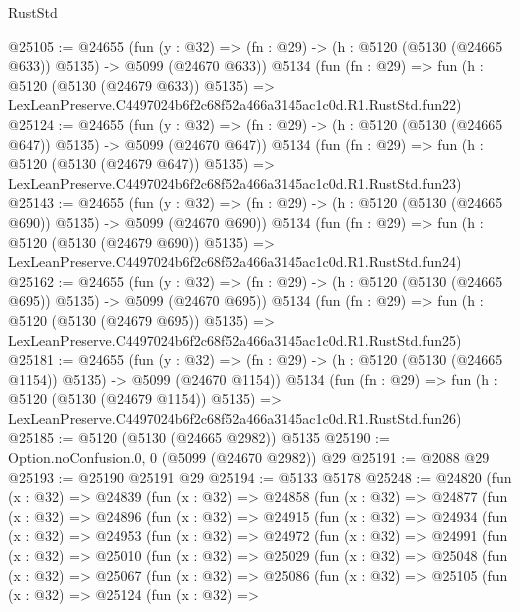 \begin{lexlean}{RustStd}
\begin{coremodule}
@25105 := @24655
    (fun (y : @32) => (fn : @29) -> (h : @5120 (@5130 (@24665 @633)) @5135) -> @5099 (@24670 @633))
    @5134
    (fun (fn : @29) =>
    fun (h : @5120 (@5130 (@24679 @633)) @5135) =>
    LexLeanPreserve.C4497024b6f2c68f52a466a3145ac1c0d.R1.RustStd.fun22)
@25124 := @24655
    (fun (y : @32) => (fn : @29) -> (h : @5120 (@5130 (@24665 @647)) @5135) -> @5099 (@24670 @647))
    @5134
    (fun (fn : @29) =>
    fun (h : @5120 (@5130 (@24679 @647)) @5135) =>
    LexLeanPreserve.C4497024b6f2c68f52a466a3145ac1c0d.R1.RustStd.fun23)
@25143 := @24655
    (fun (y : @32) => (fn : @29) -> (h : @5120 (@5130 (@24665 @690)) @5135) -> @5099 (@24670 @690))
    @5134
    (fun (fn : @29) =>
    fun (h : @5120 (@5130 (@24679 @690)) @5135) =>
    LexLeanPreserve.C4497024b6f2c68f52a466a3145ac1c0d.R1.RustStd.fun24)
@25162 := @24655
    (fun (y : @32) => (fn : @29) -> (h : @5120 (@5130 (@24665 @695)) @5135) -> @5099 (@24670 @695))
    @5134
    (fun (fn : @29) =>
    fun (h : @5120 (@5130 (@24679 @695)) @5135) =>
    LexLeanPreserve.C4497024b6f2c68f52a466a3145ac1c0d.R1.RustStd.fun25)
@25181 := @24655
    (fun (y : @32) =>
    (fn : @29) -> (h : @5120 (@5130 (@24665 @1154)) @5135) -> @5099 (@24670 @1154))
    @5134
    (fun (fn : @29) =>
    fun (h : @5120 (@5130 (@24679 @1154)) @5135) =>
    LexLeanPreserve.C4497024b6f2c68f52a466a3145ac1c0d.R1.RustStd.fun26)
@25185 := @5120 (@5130 (@24665 @2982)) @5135
@25190 := Option.noConfusion.{0, 0} (@5099 (@24670 @2982)) @29
@25191 := @2088 @29
@25193 := @25190 @25191 @29
@25194 := @5133 @5178
@25248 := @24820
    (fun (x : @32) =>
    @24839
      (fun (x : @32) =>
      @24858
        (fun (x : @32) =>
        @24877
          (fun (x : @32) =>
          @24896
            (fun (x : @32) =>
            @24915
              (fun (x : @32) =>
              @24934
                (fun (x : @32) =>
                @24953
                  (fun (x : @32) =>
                  @24972
                    (fun (x : @32) =>
                    @24991
                      (fun (x : @32) =>
                      @25010
                        (fun (x : @32) =>
                        @25029
                          (fun (x : @32) =>
                          @25048
                            (fun (x : @32) =>
                            @25067
                              (fun (x : @32) =>
                              @25086
                                (fun (x : @32) =>
                                @25105
                                  (fun (x : @32) =>
                                  @25124
                                    (fun (x : @32) =>

\end{coremodule}
\end{lexlean}
